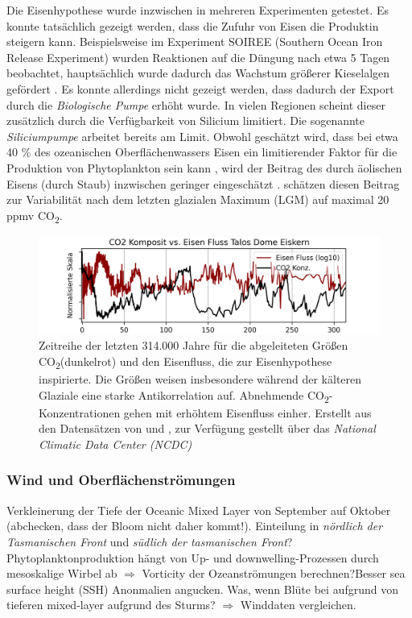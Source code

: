 \documentclass[12pt,a4paper,onecolumn,draft]{scrartcl}
\newcommand{\cotwo}{CO\textsubscript{2}}
\begin{document}
Die Eisenhypothese wurde inzwischen in mehreren Experimenten getestet. Es konnte tatsächlich gezeigt werden, dass die Zufuhr von Eisen die Produktin steigern kann. Beispielsweise im Experiment SOIREE (Southern Ocean Iron Release Experiment) wurden Reaktionen auf die Düngung nach etwa 5 Tagen beobachtet, hauptsächlich wurde dadurch das Wachstum größerer Kieselalgen gefördert \citep{Trull.2001}. Es konnte allerdings nicht gezeigt werden, dass dadurch der Export durch die \textit{Biologische Pumpe} erhöht wurde. In vielen Regionen scheint dieser zusätzlich durch die Verfügbarkeit von Silicium limitiert. Die sogenannte \textit{Siliciumpumpe} arbeitet bereits am Limit. Obwohl geschätzt wird, dass bei etwa 40 \% des ozeanischen Oberflächenwassers Eisen ein limitierender Faktor für die Produktion von Phytoplankton sein kann \citep{Emerson.2009}, wird der Beitrag des durch äolischen Eisens (durch Staub) inzwischen geringer eingeschätzt \citep{Tagliabue.2017}. \citet{Vallelonga.2013} schätzen diesen Beitrag zur Variabilität nach dem letzten glazialen Maximum (LGM) auf maximal 20 ppmv \cotwo .

\begin{figure}[ht]
\centering
\includegraphics[width=\textwidth]{bilder/co2_iron.png}
\caption{ Zeitreihe der letzten 314.000 Jahre für die abgeleiteten Größen \cotwo (dunkelrot) und den Eisenfluss, die zur Eisenhypothese inspirierte. Die Größen weisen insbesondere während der kälteren Glaziale eine starke Antikorrelation auf. Abnehmende \cotwo -Konzentrationen gehen mit erhöhtem Eisenfluss einher. Erstellt aus den Datensätzen von \cite{Bereiter.2015} und \cite{Vallelonga.2013}, zur Verfügung gestellt über das \textit{National Climatic Data Center (NCDC) }  }   \label{fig:co2iron}
\end{figure}

\subsubsection{Wind und Oberflächenströmungen}
Verkleinerung der Tiefe der Oceanic Mixed Layer von September auf Oktober \citep{Tilburg.2002} (abchecken, dass der Bloom nicht daher kommt!). Einteilung in \textit{nördlich der Tasmanischen Front} und \textit{südlich der tasmanischen Front}? Phytoplanktonproduktion hängt von Up- und downwelling-Prozessen durch mesoskalige Wirbel ab \citep{Tilburg.2002} $\Rightarrow$ Vorticity der Ozeanströmungen berechnen?Besser sea surface height (SSH) Anonmalien angucken. Was, wenn Blüte bei \citet{Gabric.2016} aufgrund von tieferen mixed-layer aufgrund des Sturms? $\Rightarrow$ Winddaten vergleichen.
\end{document}
